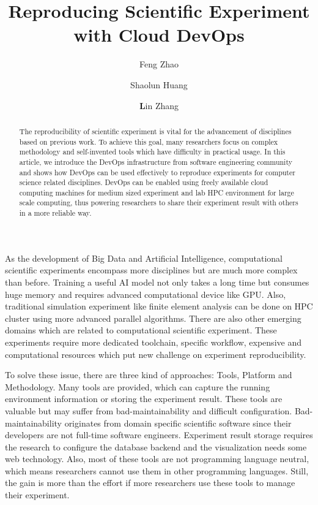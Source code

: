 \documentclass{IEEEcsmag}
\begin{document}

\title{Reproducing Scientific Experiment with Cloud DevOps}

\author{Feng Zhao}

\author{Shaolun Huang}

\author{\textbf{L}in Zhang}


\begin{abstract}
The reproducibility of scientific experiment is vital for the advancement of disciplines based on previous work. To achieve this goal, many researchers focus on complex methodology and self-invented tools which have difficulty in practical usage. In this article, we introduce the DevOps infrastructure from software engineering community and shows how DevOps can be used effectively to reproduce experiments for computer science related disciplines. DevOps can be enabled using freely available cloud computing machines for medium sized experiment and lab HPC environment for large scale computing, thus powering researchers to share their experiment result with others in a more reliable way.
\end{abstract}

\maketitle

 As the development of Big Data and Artificial Intelligence, computational scientific experiments encompass more disciplines but are much more complex than before. Training a useful AI model not only takes a long time but consumes huge memory and requires advanced computational device like GPU. Also, traditional simulation experiment like finite element analysis can be done on HPC cluster using more advanced parallel algorithms. There are also other emerging domains which are related to computational scientific experiment. These experiments require more dedicated toolchain, specific workflow, expensive and computational resources which put new challenge on experiment reproducibility.

To solve these issue, there are three kind of approaches: Tools, Platform and Methodology. Many tools \cite{greff2017sacred} are provided, which can capture the running environment information or storing the experiment result. These tools are valuable but may suffer from bad-maintainability and difficult configuration. Bad-maintainability originates from domain specific scientific software since their developers are not full-time software engineers. Experiment result storage requires the research to configure the database backend and the visualization needs some web technology. Also, most of these tools are not programming language neutral, which means researchers cannot use them in other programming languages. Still, the gain is more than the effort if more researchers use these tools to manage their experiment.
\end{document}

